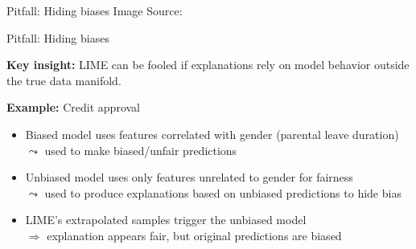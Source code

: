 \documentclass[11pt,compress,t,notes=noshow, aspectratio=169, xcolor=table]{beamer}
\begin{document}
\begin{frame}{Pitfall: Hiding biases }
	    Image Source: 
\end{frame}



\begin{frame}{Pitfall: Hiding biases }

\textbf{Key insight:} LIME can be fooled if explanations rely on model behavior outside the true data manifold.

\lz
   
\textbf{Example:} Credit approval
  \begin{itemize}
    \item Biased model uses features correlated with gender (parental leave duration)\\
    $\leadsto$ used to make biased/unfair predictions
    \item Unbiased model uses only features unrelated to gender for fairness\\%
    $\leadsto$ used to produce explanations based on unbiased predictions to hide bias
    \item LIME’s extrapolated samples trigger the unbiased model\\
    $\Rightarrow$ explanation appears fair, but original predictions are biased
  \end{itemize}

\end{frame}
\end{document}
